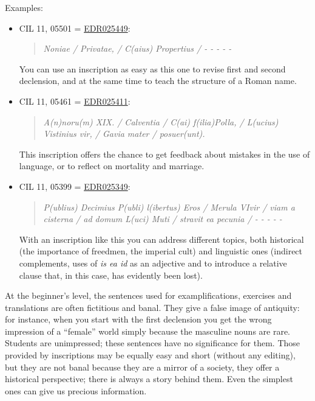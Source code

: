 \documentclass[amsthm,ebook]{saparticle}
\begin{document}
Examples:

\begin{itemize}
\item CIL 11, 05501 = \href{http://www.edr-edr.it/edr\_programmi/res\_complex\_comune.php?do=book\&id\_nr=EDR025449}{EDR025449}: \begin{quotation}
\emph{Noniae / Privatae, / C(aius) Propertius / - - - - -}
\end{quotation}

You can use an inscription as easy as this one to revise first and second declension, and at the same time to teach the
structure of a Roman name.

\item CIL 11, 05461 = \href{http://www.edr-edr.it/edr\_programmi/res\_complex\_comune.php?do=book\&id\_nr=EDR025411}{EDR025411}: \begin{quotation}
\emph{A(n)noru(m) XIX. / Calventia / C(ai) f(ilia)Polla, / L(ucius) Vistinius vir, / Gavia mater / posuer(unt).}

\end{quotation}
This inscription offers the chance to get feedback about mistakes in the use of language, or to reflect on mortality and
marriage.

\item CIL 11, 05399 = \href{http://www.edr-edr.it/edr\_programmi/res\_complex\_comune.php?do=book\&id\_nr=EDR025349}{EDR025349}: \begin{quotation}
\emph{P(ublius) Decimius P(ubli) l(ibertus) Eros /  Merula VIvir / viam a cisterna / ad domum L(uci) Muti / stravit ea pecunia / - - - - - }
\end{quotation}

With an inscription like this you can address different topics, both historical (the importance of freedmen, the
imperial cult) and linguistic ones (indirect complements, uses of \emph{is ea id} as an adjective and to introduce a relative
clause that, in this case, has evidently been lost).
\end{itemize}





At the beginner’s level, the sentences used for examplifications, exercises and translations are often fictitious and banal.
They give a false image of antiquity: for instance, when you start with the first declension you get the wrong
impression of a ``female'' world simply because the masculine nouns are rare. Students are unimpressed; these sentences have
no significance for them. Those provided by inscriptions may be equally easy and short (without any editing), but they are not banal because
they are a mirror of a society, they offer a historical perspective; there is always a story behind them. Even the
simplest ones can give us precious information.
\end{document}
